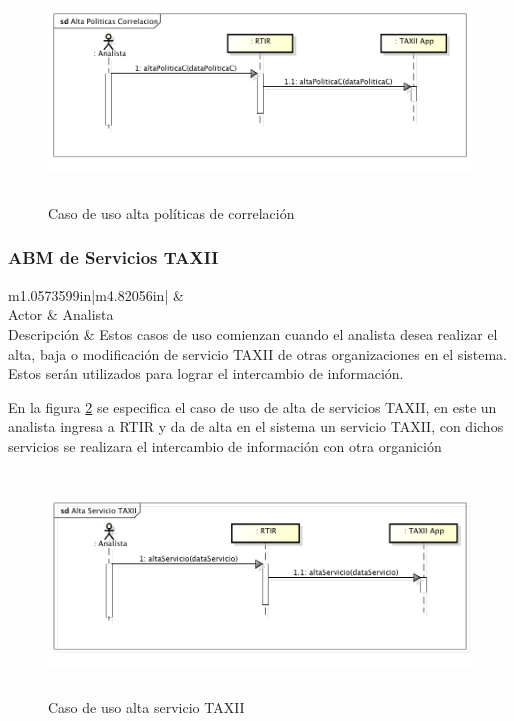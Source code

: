 \begin{figure}[H]
	\centering
	\includegraphics[width=5.7638in,height=2.2535in]{Analisis22-img/Analisis22-img022.png} 
	\caption{Caso de uso alta políticas de correlación}
	\label{fig.altacorrelacion}
\end{figure}

\subsubsection{ABM de Servicios TAXII}

\bigskip

\begin{flushleft}
	\tablefirsthead{}
	\tablehead{}
	\tabletail{}
	\tablelasttail{}
	\begin{supertabular}{m{1.0573599in}|m{4.82056in}|}
		 &
		\\\hline
		{Actor} &
		{Analista}\\
		{Descripción} &
		{Estos casos de uso comienzan cuando el analista desea realizar el alta, baja o
			modificación de servicio TAXII de otras organizaciones en el sistema. Estos serán utilizados para lograr el intercambio
			de información.}\\\hhline{~-}
	\end{supertabular}
\end{flushleft}

\bigskip
	En la figura \ref{fig.altaserviciotaxii} se especifica el caso de uso de alta de servicios TAXII, en este un analista ingresa a RTIR y da de alta
	en el sistema un servicio TAXII, con dichos servicios se realizara el intercambio de información con otra organición

\begin{figure}[H]
	\centering
	\includegraphics[width=5.7638in,height=2.3217in]{Analisis22-img/Analisis22-img023.png} 
	\caption{Caso de uso alta servicio TAXII}
	\label{fig.altaserviciotaxii}
\end{figure}

